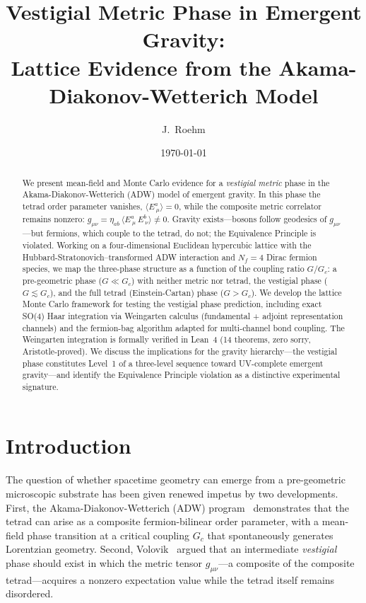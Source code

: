 \documentclass[aps,prd,twocolumn,superscriptaddress,nofootinbib]{revtex4-2}
\newcommand{\vev}[1]{\langle #1 \rangle}
\newcommand{\Gc}{G_c}
\newcommand{\Nf}{N_f}
\begin{document}
\title{Vestigial Metric Phase in Emergent Gravity: \\
Lattice Evidence from the Akama-Diakonov-Wetterich Model}

\author{J.~Roehm}

\date{\today}

\begin{abstract}
We present mean-field and Monte Carlo evidence for a \emph{vestigial metric}
phase in the Akama-Diakonov-Wetterich (ADW) model of emergent gravity. In
this phase the tetrad order parameter vanishes,
$\vev{E^a_{\ \mu}} = 0$, while the composite metric correlator remains
nonzero: $g_{\mu\nu} = \eta_{ab}\,\vev{E^a_{\ \mu}\, E^b_{\ \nu}} \neq 0$.
Gravity exists---bosons follow geodesics of $g_{\mu\nu}$---but fermions,
which couple to the tetrad, do not; the Equivalence Principle is violated.
Working on a four-dimensional Euclidean hypercubic lattice with the
Hubbard-Stratonovich--transformed ADW interaction and $\Nf=4$ Dirac
fermion species, we map the three-phase structure as a function of the
coupling ratio $G/\Gc$: a pre-geometric phase ($G \ll \Gc$) with neither
metric nor tetrad, the vestigial phase ($G \lesssim \Gc$), and the full
tetrad (Einstein-Cartan) phase ($G > \Gc$). We develop the lattice
Monte Carlo framework for testing the vestigial phase prediction,
including exact SO(4) Haar integration via Weingarten calculus
(fundamental + adjoint representation channels) and the fermion-bag
algorithm adapted for multi-channel bond coupling. The Weingarten
integration is formally verified in Lean~4 (14 theorems, zero sorry,
Aristotle-proved). We discuss the implications for the gravity
hierarchy---the vestigial phase constitutes Level~1 of a three-level
sequence toward UV-complete emergent gravity---and identify the
Equivalence Principle violation as a distinctive experimental signature.
\end{abstract}

\maketitle

\section{Introduction}
\label{sec:intro}

The question of whether spacetime geometry can emerge from a pre-geometric
microscopic substrate has been given renewed impetus by two developments.
First, the Akama-Diakonov-Wetterich (ADW) program~\cite{Akama1978,
Diakonov2011,Wetterich2004} demonstrates that the tetrad can arise as a
composite fermion-bilinear order parameter, with a mean-field phase
transition at a critical coupling $\Gc$ that spontaneously generates
Lorentzian geometry. Second, Volovik~\cite{Volovik2024} argued that an
intermediate \emph{vestigial} phase should exist in which the metric
tensor $g_{\mu\nu}$---a composite of the composite tetrad---acquires a
nonzero expectation value while the tetrad itself remains disordered.
\end{document}
